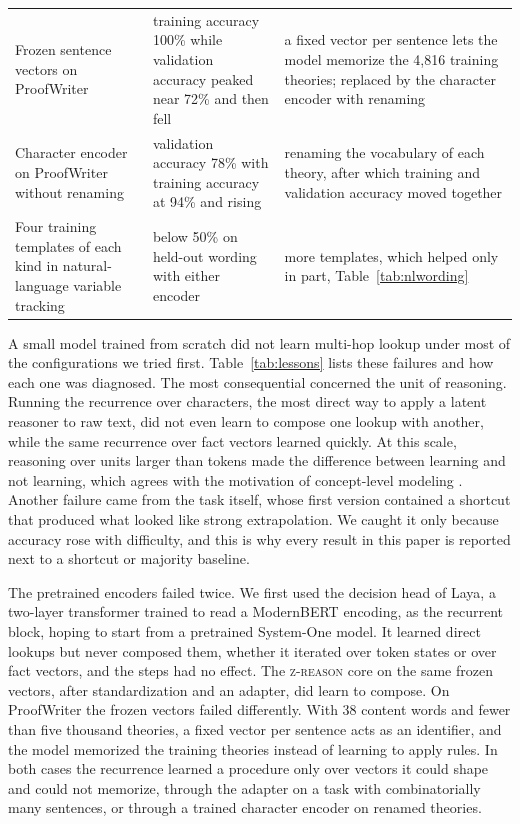 \documentclass{article}
\newcommand{\zr}{\textsc{z-reason}}
\begin{document}
\begin{table}[t]
\begin{tabular}{@{}p{4.6cm}p{4.5cm}p{4.9cm}@{}}
Frozen sentence vectors on ProofWriter & training accuracy 100\% while validation accuracy peaked near 72\% and then fell & a fixed vector per sentence lets the model memorize the 4{,}816 training theories; replaced by the character encoder with renaming \\
Character encoder on ProofWriter without renaming & validation accuracy 78\% with training accuracy at 94\% and rising & renaming the vocabulary of each theory, after which training and validation accuracy moved together \\
Four training templates of each kind in natural-language variable tracking & below 50\% on held-out wording with either encoder & more templates, which helped only in part, Table~\ref{tab:nlwording} \\
\bottomrule
\end{tabular}
\end{table}

A small model trained from scratch did not learn multi-hop lookup under most of the configurations we tried first. Table~\ref{tab:lessons} lists these failures and how each one was diagnosed. The most consequential concerned the unit of reasoning. Running the recurrence over characters, the most direct way to apply a latent reasoner to raw text, did not even learn to compose one lookup with another, while the same recurrence over fact vectors learned quickly. At this scale, reasoning over units larger than tokens made the difference between learning and not learning, which agrees with the motivation of concept-level modeling \cite{barrault2024lcm}. Another failure came from the task itself, whose first version contained a shortcut that produced what looked like strong extrapolation. We caught it only because accuracy rose with difficulty, and this is why every result in this paper is reported next to a shortcut or majority baseline.

The pretrained encoders failed twice. We first used the decision head of Laya, a two-layer transformer trained to read a ModernBERT encoding, as the recurrent block, hoping to start from a pretrained System-One model. It learned direct lookups but never composed them, whether it iterated over token states or over fact vectors, and the steps had no effect. The \zr{} core on the same frozen vectors, after standardization and an adapter, did learn to compose. On ProofWriter the frozen vectors failed differently. With 38 content words and fewer than five thousand theories, a fixed vector per sentence acts as an identifier, and the model memorized the training theories instead of learning to apply rules. In both cases the recurrence learned a procedure only over vectors it could shape and could not memorize, through the adapter on a task with combinatorially many sentences, or through a trained character encoder on renamed theories.
\end{document}
